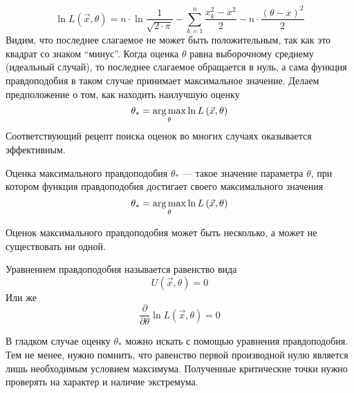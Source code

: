 \begin{example}
  \begin{equation*}
    \ln{L\left( \vec{x},\theta \right)}
    = n \cdot \ln{\frac{1}{\sqrt{2 \cdot \pi}}}
      - \sum_{k=1}^n \frac{x_k^2 - \overline{x}^2}{2}
      - n \cdot \frac{\left( \theta - \overline{x} \right)^2}{2}
  \end{equation*}
  Видим, что последнее слагаемое не может быть положительным,
  так как это квадрат со знаком ``минус''.
  Когда оценка $\theta$ равна выборочному среднему (идеальный случай),
  то последнее слагаемое обращается в нуль, а сама функция правдоподобия
  в таком случае принимает максимальное значение.
  Делаем предположение о том, как находить наилучшую оценку
  \begin{equation*}
    \theta_* = \underset{\theta}{\operatorname{arg\,max}}\ln{L\left( \vec{x}, \theta \right)}
  \end{equation*}
  Соответствующий рецепт поиска оценок во многих случаях оказывается
  эффективным.
\end{example}

\begin{definition}
  \label{def:maximumLikelihoodEstimation}
  Оценка максимального правдоподобия
  $\theta_*$ --- такое значение параметра $\theta$,
  при котором функция правдоподобия достигает своего максимального значения
  $$\theta_*= \underset{\theta}{\operatorname{arg\,max}}\ln{L\left( \vec{x},\theta \right)}$$
\end{definition}

\begin{remark}
  Оценок максимального правдоподобия может быть несколько,
  а может не существовать ни одной.
\end{remark}

\begin{definition}
  Уравнением правдоподобия называется равенство вида
  \begin{equation*}
    U\left( \vec{x}, \theta \right) = 0
  \end{equation*}
  Или же
  \begin{equation*}
    \frac{\partial}{\partial\theta}\ln{L\left( \vec{x}, \theta \right)} = 0
  \end{equation*}
\end{definition}

\begin{remark}
  В гладком случае оценку $\theta_*$ можно искать с помощью уравнения
  правдоподобия.
  Тем не менее, нужно помнить, что равенство первой производной нулю является
  лишь необходимым условием максимума.
  Полученные критические точки нужно проверять на характер и наличие
  экстремума.
\end{remark}

